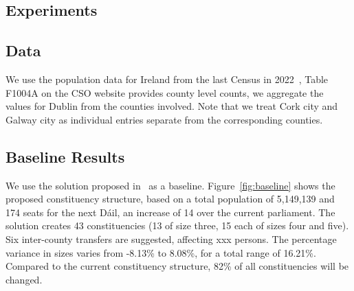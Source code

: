 \documentclass[runningheads]{llncs}
\begin{document}
\subsection{Experiments}
\subsection{Data}
We use the population data for Ireland from the last Census in 2022~\cite{CSO2022}, Table F1004A on the CSO website provides county level counts, we aggregate the values for Dublin from the counties involved. Note that we treat Cork city and Galway city as individual entries separate from the corresponding counties. 

\subsection{Baseline Results}

We use the solution proposed in~\cite{ElectoralCommission2023} as a baseline. Figure~\ref{fig:baseline} shows the proposed constituency structure, based on a total population of 5,149,139 and 174 seats for the next Dáil, an increase of 14 over the current parliament. The solution creates 43 constituencies (13 of size three, 15 each of sizes four and five). Six inter-county transfers are suggested, affecting xxx persons. The percentage variance in sizes varies from -8.13\% to 8.08\%, for a total range of 16.21\%. Compared to the current constituency structure, 82\% of all constituencies will be changed.
\end{document}
